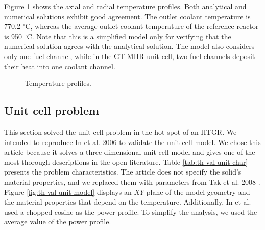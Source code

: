 Figure \ref{fig:th-ver-results} shows the axial and radial temperature profiles.
Both analytical and numerical solutions exhibit good agreement.
The outlet coolant temperature is 770.2 $^{\circ}$C, whereas the average outlet coolant temperature of the reference reactor is 950 $^{\circ}$C.
Note that this is a simplified model only for verifying that the numerical solution agrees with the analytical solution.
The model also considers only one fuel channel, while in the GT-MHR unit cell, two fuel channels deposit their heat into one coolant channel.

\begin{figure}[htbp!]
	\centering
	\hfill
    \caption{Temperature profiles.}
	\label{fig:th-ver-results}
\end{figure}

\subsection{Unit cell problem}
\label{sec:unitcell}

This section solved the unit cell problem in the hot spot of an HTGR.
We intended to reproduce In et al. 2006 \cite{in_three-dimensional_2006} to validate the unit-cell model.
We chose this article because it solves a three-dimensional unit-cell model and gives one of the most thorough descriptions in the open literature.
Table \ref{tab:th-val-unit-char} presents the problem characteristics.
The article does not specify the solid's material properties, and we replaced them with parameters from Tak et al. 2008 \cite{tak_numerical_2008}.
Figure \ref{fig:th-val-unit-model} displays an $XY$-plane of the model geometry and the material properties that depend on the temperature.
Additionally, In et al. used a chopped cosine as the power profile.
To simplify the analysis, we used the average value of the power profile.

